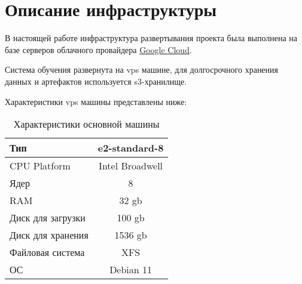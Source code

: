 \chapter{Описание инфраструктуры}
\label{sec:gcloud}
В настоящей работе инфраструктура развертывания проекта была выполнена на базе серверов облачного провайдера \href{https://cloud.google.com}{Google Cloud}.

Система обучения развернута на \gls{vps} машине, для долгосрочного хранения данных и артефактов используется \gls{s3}-хранилище.

Характеристики \gls{vps} машины представлены ниже:

\begin{table}[!h]
    \centering
    \begin{tabular}{|l|c|}
        \hline
        Тип               & e2-standard-8      \\ \hline
        CPU Platform      & Intel Broadwell    \\ \hline
        Ядер              & 8                  \\ \hline
        RAM               & 32 \acrshort{gb}   \\ \hline
        Диск для загрузки & 100 \acrshort{gb}  \\ \hline
        Диск для хранения & 1536 \acrshort{gb} \\ \hline
        Файловая система  & XFS                \\ \hline
        ОС                & Debian 11          \\ \hline
    \end{tabular}
    \caption{Характеристики основной машины}
    \label{tab:vps-info}
\end{table}


